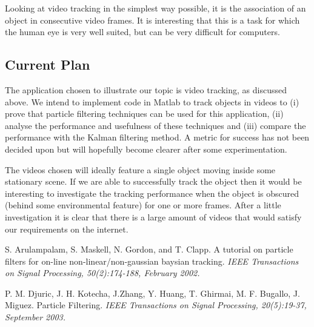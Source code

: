 \documentclass[11pt]{article}
\begin{document}
Looking at video tracking in the simplest way possible, it is the association of
an object in consecutive video frames. It is interesting that this is a task
for which the human eye is very well suited, but can be very difficult for
computers. 

\subsection{Current Plan}
The application chosen to illustrate our topic is video tracking, as discussed
above. We intend to implement code in Matlab to track objects in videos to (i)
prove that particle filtering techniques can be used for this application,
(ii) analyse the performance and usefulness of these techniques and (iii)
compare the performance with the Kalman filtering method. A metric for success
has not been decided upon but will hopefully become clearer after some
experimentation.

The videos chosen will ideally feature a single object moving inside some
stationary scene. If we are able to successfully track the object then it would
be interesting to investigate the tracking performance when the object is
obscured (behind some environmental feature) for one or more frames. After a
little investigation it is clear that there is a large amount of videos that
would satisfy our requirements on the internet.

\begin{thebibliography}{99}
 S. Arulampalam, S. Maskell, N. Gordon, and T. Clapp. A tutorial
on particle filters for on-line non-linear/non-gaussian baysian tracking.
\emph{IEEE Transactions on Signal Processing, 50(2):174-188, February 2002.}

 P. M. Djuric, J. H. Kotecha, J.Zhang, Y. Huang, T. Ghirmai, M.
F. Bugallo, J. Miguez. Particle Filtering. \emph{IEEE Transactions on Signal
Processing, 20(5):19-37, September 2003.}
\end{thebibliography}
\end{document}
